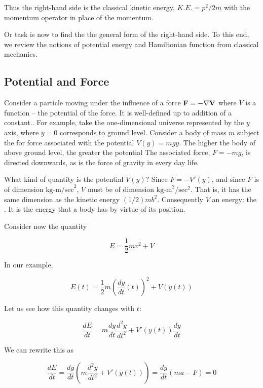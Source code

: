 Thus the right-hand side is the classical kinetic energy, $K.E. = p^2/2m$ with the momentum operator in place of the momentum.  

Or task is now to find the the general form of the right-hand side. To this end, we review the notions of potential energy and Hamiltonian function from classical mechanics.

\subsection{Potential and Force}

Consider a particle moving under the influence of a force $\bf{F} = - \nabla V$ where  $V$ is a function -- the potential of the force.  It is well-defined up to addition of a constant..  For example, take the one-dimensional universe  represented by the $y$ axis, where $y = 0$ corresponds to ground level.  Consider a body of mass $m$ subject the for force associated with the potential $V(y) = mgy$.  The higher the body of above ground level, the greater the potential  The associated force, $F = -mg$, is directed downwards, as is the force of gravity in every day life. 

What kind of quantity is the potential $V(y)$?  Since $F = -V'(y)$, and since $F$ is of dimension $\text{kg-m/sec}^2$, $V$ must be of dimension $\text{kg-m}^2/\text{sec}^2$.  That is, it has the same dimension as the kinetic energy $(1/2)mb^2$.  Consequently $V$ 
 an energy: the .
It is the energy that a body has by virtue of its position.

Consider now the quantity

\begin{equation}
  E = \frac{1}{2}mv^2 + V
\end{equation}

In our example, 

\begin{equation}
  E(t) = \frac{1}{2}m\left(\frac{dy}{dt}(t)\right)^2 + V(y(t))
\end{equation}

Let us see how this quantity changes with $t$:

\begin{equation}
  \frac{dE}{dt} = m\frac{dy}{dt}\frac{ d^2y }{ dt^2 }+ V'(y(t))\frac{dy}{dt}
\end{equation}

We can rewrite this as

\begin{equation}
  \frac{dE}{dt} 
   = \frac{dy}{dt}\left(m\frac{ d^2y }{ dt^2 }+ V'(y(t))\right) 
    = \frac{dy}{dt}\left(ma - F\right)  = 0
\end{equation}

